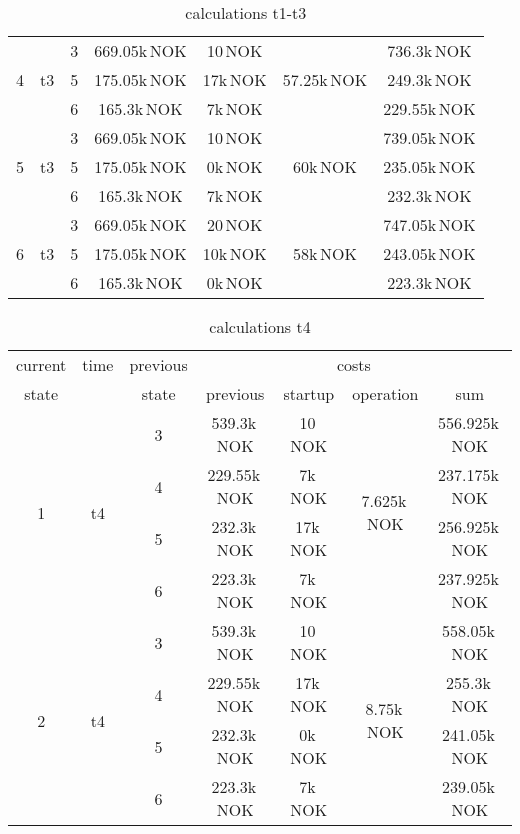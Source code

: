 \documentclass{article}
\begin{document}
\begin{table}[hbt!]
\begin{center}
\begin{tabular}[h]{|c|c|c||c|c|c||c|}
\hline
\multirow{3}{*}{4} & \multirow{3}{*}{t3}	
	&	3		&		669.05k\,NOK	&	10\,NOK			&	\multirow{3}{*}{57.25k\,NOK}		&	736.3k\,NOK\\
&	&	5		&		175.05k\,NOK	&	17k\,NOK		&										&	249.3k\,NOK\\
&	&	6		&		165.3k\,NOK		&	7k\,NOK			&										&	229.55k\,NOK\\
\hline
\multirow{3}{*}{5} & \multirow{3}{*}{t3}	
	&	3		&		669.05k\,NOK	&	10\,NOK			&	\multirow{3}{*}{60k\,NOK}			&	739.05k\,NOK\\
&	&	5		&		175.05k\,NOK	&	0k\,NOK			&										&	235.05k\,NOK\\
&	&	6		&		165.3k\,NOK		&	7k\,NOK			&										&	232.3k\,NOK\\
\hline
\multirow{3}{*}{6} & \multirow{3}{*}{t3}	
	&	3		&		669.05k\,NOK	&	20\,NOK			&	\multirow{3}{*}{58k\,NOK}			&	747.05k\,NOK\\
&	&	5		&		175.05k\,NOK	&	10k\,NOK		&										&	243.05k\,NOK\\
&	&	6		&		165.3k\,NOK		&	0k\,NOK			&										&	223.3k\,NOK\\
\hline
\end{tabular}
\caption{calculations t1-t3}\label{tab:calct13}
\end{center}
\end{table}

	\begin{table}[hbt!]
\begin{center}
\begin{tabular}[h]{|c|c|c||c|c|c||c|}
\hline
current & time & previous   & \multicolumn{4}{|c|}{costs}\\
\cline{4-7}
state  		&      	&  state    &   previous    	&    startup   		& operation 		&  sum \\
\hline
\hline
\multirow{4}{*}{1} & \multirow{4}{*}{t4}	
	&	3		&		539.3k\,NOK			&	10\,NOK			&	\multirow{4}{*}{7.625k\,NOK}		&	556.925k\,NOK\\
&	&	4		&		229.55k\,NOK		&	7k\,NOK			&										&	237.175k\,NOK\\
&	&	5		&		232.3k\,NOK			&	17k\,NOK		&										&	256.925k\,NOK\\
&	&	6		&		223.3k\,NOK			&	7k\,NOK			&										&	237.925k\,NOK\\
\hline
\multirow{4}{*}{2} & \multirow{4}{*}{t4}	
	&	3		&		539.3k\,NOK			&	10\,NOK			&	\multirow{4}{*}{8.75k\,NOK}		&	558.05k\,NOK\\
&	&	4		&		229.55k\,NOK		&	17k\,NOK		&										&	255.3k\,NOK\\
&	&	5		&		232.3k\,NOK			&	0k\,NOK			&										&	241.05k\,NOK\\
&	&	6		&		223.3k\,NOK			&	7k\,NOK			&										&	239.05k\,NOK\\
\hline
\end{tabular}
\caption{calculations t4}\label{tab:calct4}
\end{center}
\end{table}
\end{document}
